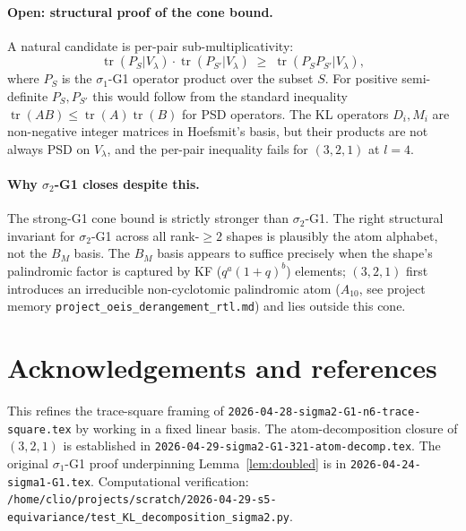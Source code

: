 \documentclass{article}
\theoremstyle{definition}
\begin{document}
\paragraph{Open: structural proof of the cone bound.}
A natural candidate is per-pair sub-multiplicativity:
\[
  \operatorname{tr}(P_S | V_\lambda) \cdot \operatorname{tr}(P_{S'} | V_\lambda) \;\geq\; \operatorname{tr}(P_S P_{S'} | V_\lambda),
\]
where $P_S$ is the $\sigma_1$-G1 operator product over the subset $S$. For
positive semi-definite $P_S, P_{S'}$ this would follow from the standard
inequality $\operatorname{tr}(AB) \leq \operatorname{tr}(A)\operatorname{tr}(B)$
for PSD operators. The KL operators $D_i, M_i$ are non-negative integer
matrices in Hoefsmit's basis, but their products are not always PSD on
$V_\lambda$, and the per-pair inequality fails for $(3,2,1)$ at $l=4$.

\paragraph{Why $\sigma_2$-G1 closes despite this.}
The strong-G1 cone bound is strictly stronger than $\sigma_2$-G1. The right
structural invariant for $\sigma_2$-G1 across all rank-$\geq 2$ shapes is
plausibly the atom alphabet, not the $B_M$ basis. The $B_M$ basis appears to
suffice precisely when the shape's palindromic factor is captured by KF
($q^a(1+q)^b$) elements; $(3,2,1)$ first introduces an irreducible
non-cyclotomic palindromic atom ($A_{10}$, see project memory
\texttt{project\_oeis\_derangement\_rtl.md}) and lies outside this cone.

\section*{Acknowledgements and references}

This refines the trace-square framing of
\texttt{2026-04-28-sigma2-G1-n6-trace-square.tex} by working in a fixed
linear basis. The atom-decomposition closure of $(3,2,1)$ is established in
\texttt{2026-04-29-sigma2-G1-321-atom-decomp.tex}. The original $\sigma_1$-G1
proof underpinning Lemma~\ref{lem:doubled} is in
\texttt{2026-04-24-sigma1-G1.tex}. Computational verification:
\texttt{/home/clio/projects/scratch/2026-04-29-s5-equivariance/test\_KL\_decomposition\_sigma2.py}.
\end{document}
